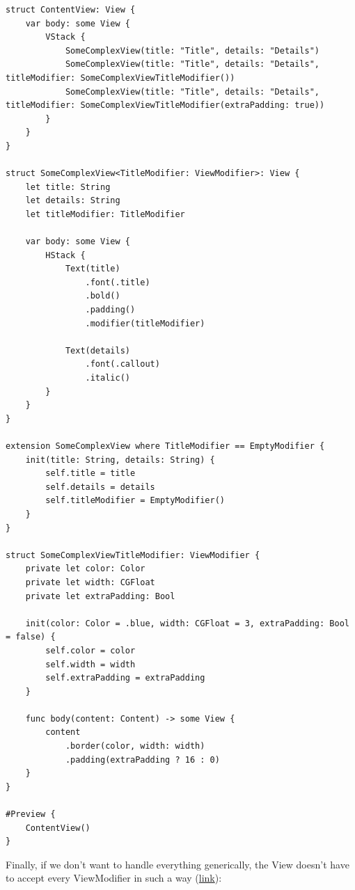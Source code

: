 \documentclass{article}
\begin{document}
\begin{lstlisting}
struct ContentView: View {
    var body: some View {
        VStack {
            SomeComplexView(title: "Title", details: "Details")
            SomeComplexView(title: "Title", details: "Details", titleModifier: SomeComplexViewTitleModifier())
            SomeComplexView(title: "Title", details: "Details", titleModifier: SomeComplexViewTitleModifier(extraPadding: true))
        }
    }
}

struct SomeComplexView<TitleModifier: ViewModifier>: View {
    let title: String
    let details: String
    let titleModifier: TitleModifier

    var body: some View {
        HStack {
            Text(title)
                .font(.title)
                .bold()
                .padding()
                .modifier(titleModifier)

            Text(details)
                .font(.callout)
                .italic()
        }
    }
}

extension SomeComplexView where TitleModifier == EmptyModifier {
    init(title: String, details: String) {
        self.title = title
        self.details = details
        self.titleModifier = EmptyModifier()
    }
}

struct SomeComplexViewTitleModifier: ViewModifier {
    private let color: Color
    private let width: CGFloat
    private let extraPadding: Bool

    init(color: Color = .blue, width: CGFloat = 3, extraPadding: Bool = false) {
        self.color = color
        self.width = width
        self.extraPadding = extraPadding
    }

    func body(content: Content) -> some View {
        content
            .border(color, width: width)
            .padding(extraPadding ? 16 : 0)
    }
}

#Preview {
    ContentView()
}
\end{lstlisting}

Finally, if we don’t want to handle everything generically, the View doesn’t have to accept every ViewModifier in such a way (\href{https://github.com/stateman92/Medium-ViewModifier/commit/76ddf9cae9d9a7d107827a18582c96e64ce8ee2b}{link}):
\end{document}
